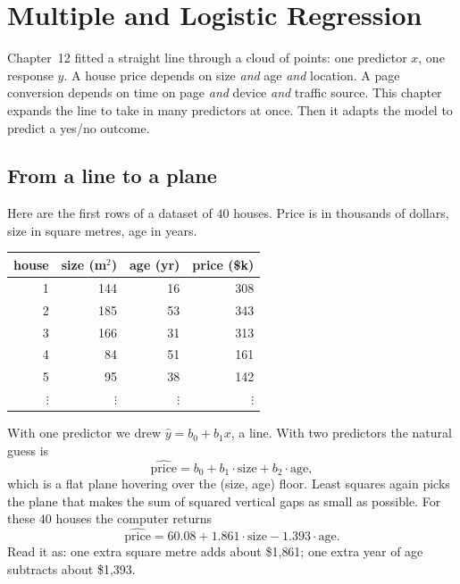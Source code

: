 \chapter{Multiple and Logistic Regression}
\label{ch:multiple-logistic-regression}

Chapter~12 fitted a straight line through a cloud of points: one predictor $x$, one
response $y$. A house price depends on size
\emph{and} age \emph{and} location. A page conversion depends on time on page
\emph{and} device \emph{and} traffic source. This chapter expands the line to take in
many predictors at once. Then it adapts the model to predict a yes/no outcome.

\section{From a line to a plane}
\label{sec:mlr-plane}

Here are the first rows of a dataset of $40$ houses. Price is in thousands of dollars,
size in square metres, age in years.

\begin{center}
\begin{tabular}{rrrr}
\toprule
house & size (m$^2$) & age (yr) & price (\$k) \\
\midrule
1 & 144 & 16 & 308 \\
2 & 185 & 53 & 343 \\
3 & 166 & 31 & 313 \\
4 & 84 & 51 & 161 \\
5 & 95 & 38 & 142 \\
$\vdots$ & $\vdots$ & $\vdots$ & $\vdots$ \\
\bottomrule
\end{tabular}
\end{center}

With one predictor we drew $\hat y = b_0 + b_1 x$, a line. With two predictors the
natural guess is
\[
  \widehat{\text{price}} = b_0 + b_1\cdot\text{size} + b_2\cdot\text{age},
\]
which is a flat plane hovering over the (size, age) floor. Least squares again picks
the plane that makes the sum of squared vertical gaps as small as possible. For these
$40$ houses the computer returns
\[
  \widehat{\text{price}} = 60.08 + 1.861\cdot\text{size} - 1.393\cdot\text{age}.
\]
Read it as: one extra square metre adds about \$1{,}861; one extra year of age
subtracts about \$1{,}393.


